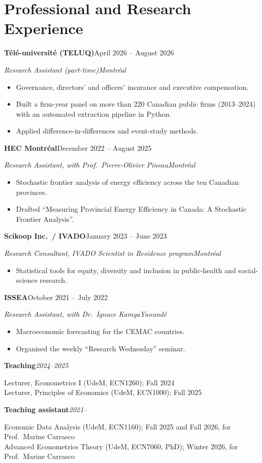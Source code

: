 \documentclass[11pt,letterpaper]{article}
\newenvironment{block}{\begin{list}{}{\setlength{\leftmargin}{1.6em}\setlength{\topsep}{0pt}%
  \setlength{\partopsep}{0pt}\setlength{\itemsep}{0pt}\setlength{\parsep}{0pt}}\item[]}{\end{list}}
\newcommand{\entry}[2]{\textbf{#1}\hfill\textit{#2}\par}
\newcommand{\job}[4]{\textbf{#1}\hfill #2\par\textit{#3}\hfill\textit{#4}\par}
\newcommand{\gap}{\par\vspace{0.6em}}
\begin{document}
\section*{Professional and Research Experience}
\begin{block}
\job{Télé-université (TELUQ)}{April 2026 -- August 2026}{Research Assistant (part-time)}{Montréal}
\begin{itemize}
\item Governance, directors' and officers' insurance and executive compensation.
\item Built a firm-year panel on more than 220 Canadian public firms (2013--2024) with an automated
      extraction pipeline in Python.
\item Applied difference-in-differences and event-study methods.
\end{itemize}
\gap
\job{HEC Montréal}{December 2022 -- August 2025}{Research Assistant, with Prof.\ Pierre-Olivier Pineau}{Montréal}
\begin{itemize}
\item Stochastic frontier analysis of energy efficiency across the ten Canadian provinces.
\item Drafted ``Measuring Provincial Energy Efficiency in Canada: A Stochastic Frontier Analysis''.
\end{itemize}
\gap
\job{Scikoop Inc.\ / IVADO}{January 2023 -- June 2023}{Research Consultant, IVADO Scientist in Residence program}{Montréal}
\begin{itemize}
\item Statistical tools for equity, diversity and inclusion in public-health and social-science research.
\end{itemize}
\gap
\job{ISSEA}{October 2021 -- July 2022}{Research Assistant, with Dr.\ Ignace Kamga}{Yaoundé}
\begin{itemize}
\item Macroeconomic forecasting for the CEMAC countries.
\item Organised the weekly ``Research Wednesday'' seminar.
\end{itemize}
\gap
\entry{Teaching}{2024--2025}
Lecturer, Econometrics I (UdeM, ECN1260); Fall 2024\\
Lecturer, Principles of Economics (UdeM, ECN1000); Fall 2025
\gap
\entry{Teaching assistant}{2021--}
Economic Data Analysis (UdeM, ECN1160); Fall 2025 and Fall 2026, for Prof.\ Marine Carrasco\\
Advanced Econometrics Theory (UdeM, ECN7060, PhD); Winter 2026, for Prof.\ Marine Carrasco\\

\end{block}
\end{document}
